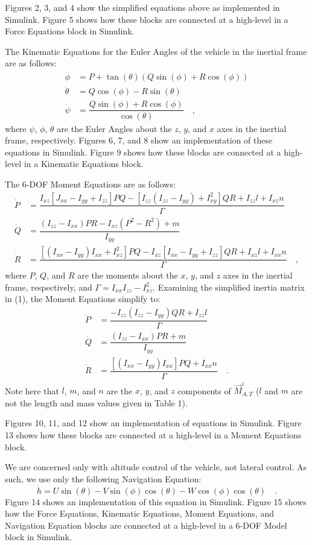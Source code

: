 Figures 2, 3, and 4 show the simplified equations %
above as implemented in Simulink. %
Figure 5 shows how these blocks are connected at a high-level in a Force Equations block in Simulink.

The Kinematic Equations for the Euler Angles of the vehicle in the inertial frame are as follows:
\begin{align}
    \dot{\phi} &= P + \tan(\theta)(Q\sin(\phi) + R\cos(\phi)) \\
    \dot{\theta} &= Q\cos(\phi) - R\sin(\theta) \\
    \dot{\psi} &= \dfrac{Q\sin(\phi) + R\cos(\phi)}{\cos(\theta)} \quad ,
\end{align}
where $\psi$, $\phi$, $\theta$ are the Euler Angles about the $z$, $y$, and $x$ axes in the inertial frame, respectively. Figures 6, 7, and 8 show an implementation of these equations in Simulink. Figure 9 shows how these blocks are connected at a high-level in a Kinematic Equations block. %

The 6-DOF Moment Equations are as follows:
\begin{align*}
    \dot{P} &= \dfrac{I_{xz}[ J_{xx} - I_{yy} + I_{zz} ]PQ - [ I_{zz}(I_{zz} - I_{yy}) + I_{xy}^2 ]QR + I_{zz} l + I_{xz} n}{\Gamma} \\
    \dot{Q} &= \dfrac{(I_{zz} - I_{xx})PR - I_{xz}(P^2 - R^2) + m}{I_{yy}} \\
    \dot{R} &= \dfrac{[(I_{xx} - I_{yy})I_{xx} + I_{xz}^2]PQ - I_{xz}[I_{xx} - I_{yy} + I_{zz}]QR + I_{xz} l + I_{xx} n}{\Gamma} \quad ,
\end{align*}
where $P$, $Q$, and $R$ are the moments about the $x$, $y$, and $z$ axes in the inertial frame, respectively, and $\Gamma = I_{xx}I_{zz} - I_{xz}^2$. Examining the simplified inertia matrix in (1), the Moment Equations simplify to:
\begin{align}
    \dot{P} &= \dfrac{-I_{zz}(I_{zz} - I_{yy})QR + I_{zz} l}{\Gamma} \\
    \dot{Q} &= \dfrac{(I_{zz} - I_{xx})PR + m}{I_{yy}} \\
    \dot{R} &= \dfrac{[(I_{xx} - I_{yy})I_{xx}]PQ + I_{xx} n}{\Gamma} \quad .
\end{align}
\noindent Note here that $l$, $m$, and $n$ are the $x$, $y$, and $z$ components of $\vec{M}_{A,T}^i$ ($l$ and $m$ are not the length and mass values given in Table 1).

Figures 10, 11, and 12 show an implementation of equations %
in Simulink. Figure 13 shows how these blocks are connected at a high-level in a Moment Equations block.

We are concerned only with altitude control of the vehicle, not lateral control. As such, we use only the following Navigation Equation:
\begin{equation}
    \dot{h} = U\sin(\theta) - V\sin(\phi)\cos(\theta) - W\cos(\phi)\cos(\theta) \quad .
\end{equation}
Figure 14 shows an implementation of this equation in Simulink. Figure 15 shows how the Force Equations, Kinematic Equations, Moment Equations, and Navigation Equation blocks are connected at a high-level in a 6-DOF Model block in Simulink.